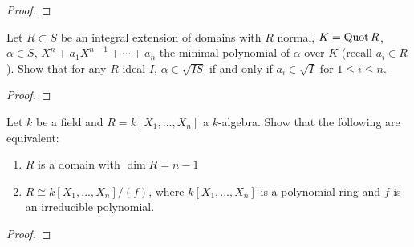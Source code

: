 \begin{proof}
\end{proof}
\newpage
\begin{problem}
Let $R\subset S$ be an integral extension of domains with $R$ normal,
$K=\operatorname{Quot} R$,  $\alpha\in S$, $X^n+a_1X^{n-1}+\cdots+a_n$ the minimal
polynomial of $\alpha$ over $K$ (recall $a_i\in R$). Show that for any
$R$-ideal $I$, $\alpha\in \sqrt{IS}$ if and only if $a_i\in\sqrt{I}$ for
$1\leq i\leq n$.
\end{problem}
\begin{proof}
\end{proof}
\newpage
\begin{problem}
Let $k$ be a field and $R=k[X_1,...,X_n]$ a $k$-algebra. Show that the
following are equivalent:
\begin{enumerate}[label=(\roman*)]
\item $R$ is a domain with $\dim R=n-1$
\item $R\cong k[X_1,...,X_n]/(f)$, where $k[X_1,...,X_n]$ is a polynomial
  ring and $f$ is an irreducible polynomial.
\end{enumerate}
\end{problem}
\begin{proof}
\end{proof}


